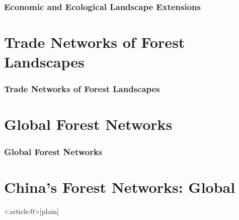 \documentclass[aspectratio=169]{beamer}
\begin{document}
\begin{frame}
  \frametitle{Economic and Ecological Landscape Extensions}
\end{frame}


\section{Trade Networks of Forest Landscapes}

\begin{frame}
  \frametitle{Trade Networks of Forest Landscapes}
\end{frame}



\section{Global Forest Networks}

\begin{frame}
  \frametitle{Global Forest Networks}
\end{frame}


\section{China's Forest Networks: Global}

{ %
    \begin{frame}<article:0>[plain]
      \frametitle{}
     \end{frame}
}
\end{document}
